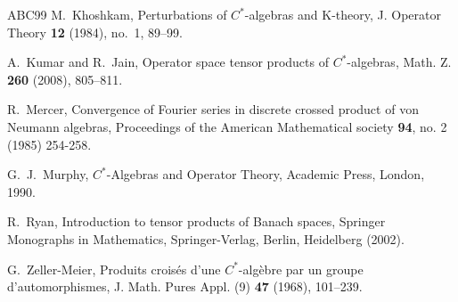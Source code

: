 \documentclass{amsart}
\numberwithin{equation}{section}
\newcommand{\1}{\mathbf{1}}
\begin{document}
\begin{thebibliography}{ABC99}
 M.~Khoshkam, Perturbations of $C^*$-algebras and
  K-theory, J. Operator Theory {\bf 12} (1984), no.~1, 89–99.

 A.~Kumar and R.~Jain, Operator space tensor products of
  $C^*$-algebras, Math. Z. {\bf 260} (2008), 805–811.

 R.~Mercer, Convergence of Fourier series in discrete
  crossed product of von Neumann algebras, Proceedings of the American
  Mathematical society {\bf 94}, no. 2 (1985) 254-258.

 G.~J.~Murphy, $C^{*}$-Algebras and Operator Theory,
  Academic Press, London, 1990.

 R.~Ryan, Introduction to tensor products of Banach spaces,
  Springer Monographs in Mathematics, Springer-Verlag, Berlin,
  Heidelberg (2002).

 G.~Zeller-Meier, Produits crois\'{e}s d’une $C^*$-alg\`{e}bre par
  un groupe d’automorphismes, J. Math. Pures Appl. (9) {\bf 47} (1968), 
  101–239.
 
\end{thebibliography}
\end{document}
